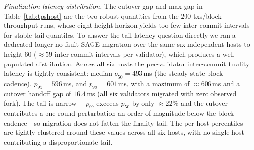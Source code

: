 \documentclass[journal]{IEEEtran}
\theoremstyle{definition}
\theoremstyle{remark}
\begin{document}
\begin{table}[t]
\centering
\caption{Real-host committed throughput and finalization latency across six independent cloud
hosts (one validator each, real TCP), for the three live-switch strategies under an
\emph{identical} configuration ($n{=}6$, $f{=}1$, $200$ txs/block, matched pacemaker). Means over
the six hosts. TPS differs by $\le 1.65\%$ across arms (observed mean spread); the cutover handoff gap
is an order of magnitude below the steady-state block cadence for every arm. Every arm migrates
with zero observed fork in the no-fault case.}
\label{tab:tpshost}
\setlength{\tabcolsep}{4pt}
\renewcommand{\arraystretch}{1.2}
\footnotesize
{}
\end{table}

\emph{Finalization-latency distribution.} The cutover gap and max gap in
Table~\ref{tab:tpshost} are the two robust quantities from the $200$-txs/block throughput runs,
whose eight-height horizon yields too few inter-commit intervals for stable tail quantiles. To
answer the tail-latency question directly we ran a dedicated longer no-fault SAGE migration over
the same six independent hosts to height $60$ (${\approx}59$ inter-commit intervals per validator),
which produces a well-populated distribution. Across all six hosts the per-validator inter-commit
finality latency is tightly consistent: median $p_{50}{=}493$\,ms (the steady-state block cadence),
$p_{95}{=}596$\,ms, and $p_{99}{=}601$\,ms, with a maximum of ${\approx}606$\,ms and a cutover
handoff gap of $16.4$\,ms (all six validators migrated with zero observed fork). The tail is narrow---
$p_{99}$ exceeds $p_{50}$ by only ${\approx}22\%$ and the cutover contributes a one-round
perturbation an order of magnitude below the block cadence---so migration does not fatten the
finality tail. The per-host percentiles are tightly clustered around these values across all six
hosts, with no single host contributing a disproportionate tail.
\end{document}
